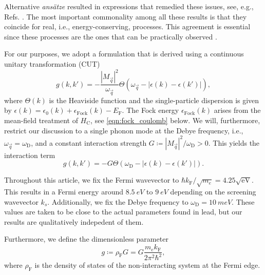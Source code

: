 \documentclass[
    reprint, 
    aps,
    preprintnumbers,
    twocolumn,
    prb,
    superscriptaddress
]{revtex4-2}
\newcommand{\kf}{k_{\mathrm{F}}}
\newcommand{\Ef}{E_\mathrm{F}}
\newcommand{\debye}{\omega_\mathrm{D}}
\newcommand{\eFock}{\epsilon_\mathrm{Fock}}
\begin{document}
Alternative \textsl{ans\"atze} resulted in expressions that remedied these issues, see, e.g., Refs. \cite{kehrein2006,lenz1996,mielke1997,mielke1997a,hubsch2003,krull2012}.
The most important commonality among all these results is that they coincide for real, i.e., energy-conserving, processes.
This agreement is essential since these processes are the ones that can be practically observed \cite{kehrein2006}.

For our purposes, we adopt a formulation that is derived using a continuous unitary transformation (CUT) \cite{krull2012}
\begin{equation}
\label{eqn:phonon_int}
  g(k, k') = - \frac{|M_{\vec{q}}|^2}{\omega_{\vec{q}}} \Theta( \omega_{\vec{q}} - |\epsilon(k) - \epsilon(k')| ),
\end{equation}
where $\Theta(k)$ is the Heaviside function and the single-particle dispersion is given by $\epsilon(k) = \epsilon_0 (k) + \eFock(k) - \Ef$.
The Fock energy $\eFock (k)$ arises from the mean-field treatment of $H_\mathrm{C}$, see \eqref{eqn:fock_coulomb} below.
We will, furthermore, restrict our discussion to a single phonon mode at the Debye frequency, i.e., $\omega_{\vec{q}} = \debye$,
and a constant interaction strength $G \coloneqq |M_{\vec{q}}|^2 / \debye > 0$.
This yields the interaction term
\begin{equation}
  g(k, k') = - G \Theta( \debye - |\epsilon(k) - \epsilon(k')| ).
\end{equation}


Throughout this article, we fix the Fermi wavevector to $\hbar \kf / \sqrt{m_e} = 4.25 \sqrt{\mathrm{eV}}$.
This results in a Fermi energy around $\SI{8.5}{eV}$ to $\SI{9}{eV}$ depending on the screening wavevector $k_s$.
Additionally, we fix the Debye frequency to $\debye = \SI{10}{meV}$.
These values are taken to be close to the actual parameters found in lead, but our results are qualitatively indepedent of them.

Furthermore, we define the dimensionless parameter 
\begin{equation}
  g \coloneqq \rho_\mathrm{F} G = G \frac{m_e \kf}{2 \pi^2 \hbar^2},
\end{equation}
where $\rho_\mathrm{F}$ is the density of states of the non-interacting system at the Fermi edge.
\end{document}
